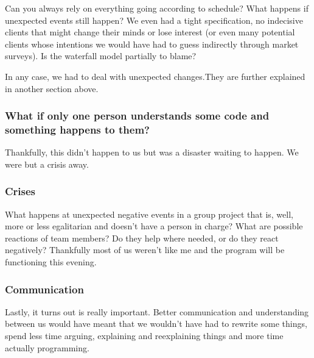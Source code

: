     Can you always rely on everything going according to schedule? What happens if unexpected events still happen? We even had a tight specification,
    no indecisive clients that might change their minds or lose interest (or even many potential clients whose intentions we would have had to guess indirectly through market surveys).
    Is the waterfall model partially to blame?
    
    In any case, we had to deal with unexpected changes.They are further explained in another section above. %
    

\subsubsection{What if only one person understands some code and something happens to them?}
    Thankfully, this didn't happen to us but was a disaster waiting to happen. We were but a crisis away.
    
\subsubsection{Crises}
    What happens at unexpected negative events in a group project that is, well,
    more or less egalitarian and doesn't have a person in charge? What are possible reactions of team members?
    Do they help where needed, or do they react negatively?
    Thankfully most of us weren't like me and the program will be functioning this evening.

\subsubsection{Communication}
    Lastly, it turns out is really important. Better communication and understanding between us
    would have meant that we wouldn't have had to rewrite some things, spend less time arguing,
    explaining and reexplaining things and more time actually programming.
